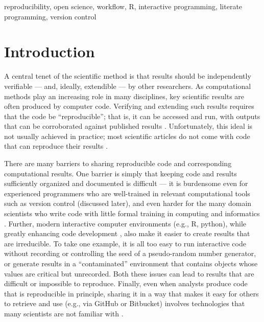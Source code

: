 \documentclass[9pt,a4paper]{extarticle}
\begin{document}
reproducibility, open science, workflow, R, interactive programming,
literate programming, version control

\clearpage

\pagestyle{main}


\section*{Introduction}

A central tenet of the scientific method is that results should be
independently verifiable --- and, ideally, extendible --- by other
researchers. As computational methods play an increasing role in many
disciplines, key scientific results are often produced by computer code.
Verifying and extending such results requires that the code be
``reproducible''; that is, it can be accessed and run, with outputs that
can be corroborated against published results \cite{Buckheit1995,
Gentleman2007, Peng2011, Ince2012, Morin2012, Sandve2013,
Easterbrook2014, Stodden2016, Lowndes2017}. Unfortunately, this ideal is
not usually achieved in practice; most scientific articles do not come
with code that can reproduce their results \cite{Ioannidis2009,
Ioannidis2014, Stodden2018}.

There are many barriers to sharing reproducible code and corresponding
computational results. One barrier is simply that keeping code and
results sufficiently organized and documented is difficult --- it is
burdensome even for experienced programmers who are well-trained in
relevant computational tools such as version control (discussed later),
and even harder for the many domain scientists who write code with
little formal training in computing and informatics \cite{Wilson2014}.
Further, modern interactive computer environments (e.g., R, python),
while greatly enhancing code development \cite{Findler2002}, also make
it easier to create results that are irreducible. To take one example,
it is all too easy to run interactive code without recording or
controlling the seed of a pseudo-random number generator, or generate
results in a ``contaminated'' environment that contains objects whose
values are critical but unrecorded. Both these issues can lead to
results that are difficult or impossible to reproduce. Finally, even
when analysts produce code that is reproducible in principle, sharing it
in a way that makes it easy for others to retrieve and use (e.g., via
GitHub or Bitbucket) involves technologies that many scientists are not
familiar with \cite{Marwick2017, Stodden2018}.
\end{document}
